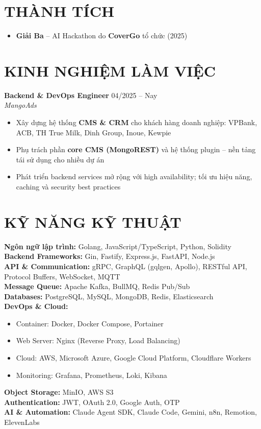 \documentclass[11pt,a4paper]{article}
\begin{document}
\section{THÀNH TÍCH}
\begin{itemize}[leftmargin=*, nosep]
    \item \textbf{Giải Ba} -- AI Hackathon do \textbf{CoverGo} tổ chức (2025)
\end{itemize}

\section{KINH NGHIỆM LÀM VIỆC}
\textbf{Backend \& DevOps Engineer} \hfill 04/2025 -- Nay \\
\textit{MangoAds} \\
\begin{itemize}[leftmargin=*, nosep]
    \item Xây dựng hệ thống \textbf{CMS \& CRM} cho khách hàng doanh nghiệp: VPBank, ACB, TH True Milk, Dinh Group, Inoue, Kewpie
    \item Phụ trách phần \textbf{core CMS (MongoREST)} và hệ thống plugin -- nền tảng tái sử dụng cho nhiều dự án
    \item Phát triển backend services mở rộng với high availability; tối ưu hiệu năng, caching và security best practices
\end{itemize}

\section{KỸ NĂNG KỸ THUẬT}

\textbf{Ngôn ngữ lập trình:} Golang, JavaScript/TypeScript, Python, Solidity \\[4pt]
\textbf{Backend Frameworks:} Gin, Fastify, Express.js, FastAPI, Node.js \\[4pt]
\textbf{API \& Communication:} gRPC, GraphQL (gqlgen, Apollo), RESTful API, Protocol Buffers, WebSocket, MQTT \\[4pt]
\textbf{Message Queue:} Apache Kafka, BullMQ, Redis Pub/Sub \\[4pt]
\textbf{Databases:} PostgreSQL, MySQL, MongoDB, Redis, Elasticsearch \\[4pt]
\textbf{DevOps \& Cloud:}
\begin{itemize}[leftmargin=*, nosep]
    \item Container: Docker, Docker Compose, Portainer
    \item Web Server: Nginx (Reverse Proxy, Load Balancing)
    \item Cloud: AWS, Microsoft Azure, Google Cloud Platform, Cloudflare Workers
    \item Monitoring: Grafana, Prometheus, Loki, Kibana
\end{itemize}
\textbf{Object Storage:} MinIO, AWS S3 \\[4pt]
\textbf{Authentication:} JWT, OAuth 2.0, Google Auth, OTP \\[4pt]
\textbf{AI \& Automation:} Claude Agent SDK, Claude Code, Gemini, n8n, Remotion, ElevenLabs
\end{document}
